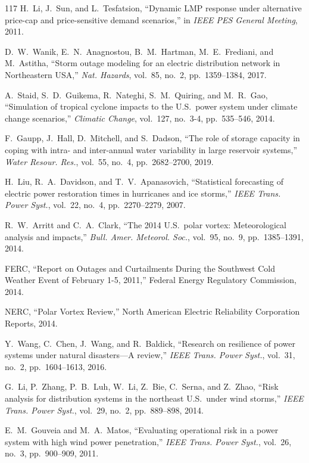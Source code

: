 \documentclass[12pt,a4paper]{article}
\begin{document}
\begin{thebibliography}{117}
 H.~Li, J.~Sun, and L.~Tesfatsion, ``Dynamic LMP response under alternative price-cap and price-sensitive demand scenarios,'' in \textit{IEEE PES General Meeting}, 2011.

 D.~W.~Wanik, E.~N.~Anagnostou, B.~M.~Hartman, M.~E.~Frediani, and M.~Astitha, ``Storm outage modeling for an electric distribution network in Northeastern USA,'' \textit{Nat. Hazards}, vol.~85, no.~2, pp.~1359--1384, 2017.

 A.~Staid, S.~D.~Guikema, R.~Nateghi, S.~M.~Quiring, and M.~R.~Gao, ``Simulation of tropical cyclone impacts to the U.S.\ power system under climate change scenarios,'' \textit{Climatic Change}, vol.~127, no.~3-4, pp.~535--546, 2014.

 F.~Gaupp, J.~Hall, D.~Mitchell, and S.~Dadson, ``The role of storage capacity in coping with intra- and inter-annual water variability in large reservoir systems,'' \textit{Water Resour. Res.}, vol.~55, no.~4, pp.~2682--2700, 2019.

 H.~Liu, R.~A.~Davidson, and T.~V.~Apanasovich, ``Statistical forecasting of electric power restoration times in hurricanes and ice storms,'' \textit{IEEE Trans. Power Syst.}, vol.~22, no.~4, pp.~2270--2279, 2007.

 R.~W.~Arritt and C.~A.~Clark, ``The 2014 U.S.\ polar vortex: Meteorological analysis and impacts,'' \textit{Bull. Amer. Meteorol. Soc.}, vol.~95, no.~9, pp.~1385--1391, 2014.

 FERC, ``Report on Outages and Curtailments During the Southwest Cold Weather Event of February 1-5, 2011,'' Federal Energy Regulatory Commission, 2014.

 NERC, ``Polar Vortex Review,'' North American Electric Reliability Corporation Reports, 2014.

 Y.~Wang, C.~Chen, J.~Wang, and R.~Baldick, ``Research on resilience of power systems under natural disasters---A review,'' \textit{IEEE Trans. Power Syst.}, vol.~31, no.~2, pp.~1604--1613, 2016.

 G.~Li, P.~Zhang, P.~B.~Luh, W.~Li, Z.~Bie, C.~Serna, and Z.~Zhao, ``Risk analysis for distribution systems in the northeast U.S.\ under wind storms,'' \textit{IEEE Trans. Power Syst.}, vol.~29, no.~2, pp.~889--898, 2014.

 E.~M.~Gouveia and M.~A.~Matos, ``Evaluating operational risk in a power system with high wind power penetration,'' \textit{IEEE Trans. Power Syst.}, vol.~26, no.~3, pp.~900--909, 2011.


\end{thebibliography}
\end{document}
